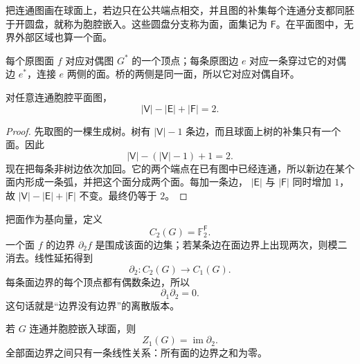 \begin{definition}[胞腔平面嵌入]
把连通图画在球面上，若边只在公共端点相交，并且图的补集每个连通分支都同胚于开圆盘，就称为胞腔嵌入。这些圆盘分支称为面，面集记为 \(\mathsf F\)。在平面图中，无界外部区域也算一个面。
\end{definition}

每个原图面 \(f\) 对应对偶图 \(G^*\) 的一个顶点；每条原图边 \(e\) 对应一条穿过它的对偶边 \(e^*\)，连接 \(e\) 两侧的面。桥的两侧是同一面，所以它对应对偶自环。

\begin{theorem}
对任意连通胞腔平面图，
\begin{equation}
|\mathsf V|-|\mathsf E|+|\mathsf F|=2.
\label{eq:phys-sm-euler-plane}
\end{equation}
\end{theorem}

\begin{proof}
先取图的一棵生成树。树有 \(|\mathsf V|-1\) 条边，而且球面上树的补集只有一个面。因此
\[
|\mathsf V|-(|\mathsf V|-1)+1=2.
\]
现在把每条非树边依次加回。它的两个端点在已有图中已经连通，所以新边在某个面内形成一条弧，并把这个面分成两个面。每加一条边，
\(|\mathsf E|\) 与 \(|\mathsf F|\) 同时增加 \(1\)，故
\(|\mathsf V|-|\mathsf E|+|\mathsf F|\) 不变。最终仍等于 \(2\)。
\end{proof}

把面作为基向量，定义
\begin{equation}
C_2(G)=\mathbb F_2^{\mathsf F}.
\label{eq:phys-sm-face-chain-space}
\end{equation}
一个面 \(f\) 的边界 \(\partial_2f\) 是围成该面的边集；若某条边在面边界上出现两次，则模二消去。线性延拓得到
\begin{equation}
\partial_2:C_2(G)\longrightarrow C_1(G).
\label{eq:phys-sm-boundary-operator-2}
\end{equation}
每条面边界的每个顶点都有偶数条边，所以
\begin{equation}
\partial_1\partial_2=0.
\label{eq:phys-sm-boundary-boundary}
\end{equation}
这句话就是“边界没有边界”的离散版本。

\begin{theorem}[平面闭链都是面边界]
\label{thm:phys-sm-plane-cycle-boundary}
若 \(G\) 连通并胞腔嵌入球面，则
\begin{equation}
Z_1(G)=\operatorname{im}\partial_2.
\label{eq:phys-sm-plane-z1-b1}
\end{equation}
全部面边界之间只有一条线性关系：所有面的边界之和为零。
\end{theorem}

